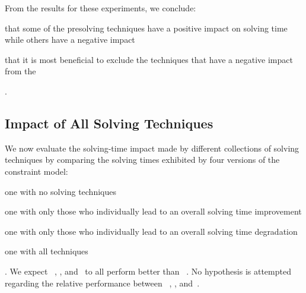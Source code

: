 From the results for these experiments, we conclude:
%
\begin{enumerate*}[label=(\roman*), itemjoin={;\ }, itemjoin*={; and\ }]
  \item that some of the \gls{presolving} techniques have a positive impact on
    solving time while others have a negative impact
  \item that it is most beneficial to exclude the techniques that have a
    negative impact from the 
\end{enumerate*}.


\subsection{Impact of All Solving Techniques}

We now evaluate the solving-time impact made by different collections of
solving techniques by comparing the solving times exhibited by four versions of
the \gls{constraint model}:
%
\begin{modelList}
  \item {}
    one with no solving techniques
  \item {}
    one with only those who individually lead to an overall solving time
    improvement
  \item {}
    one with only those who individually lead to an overall solving time
    degradation
  \item {}
    one with all techniques
\end{modelList}.
%
We expect ~,
, and~ to all perform
better than ~.
%
No hypothesis is attempted regarding the relative performance between
~,
, and~.


